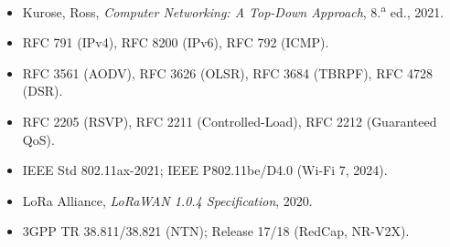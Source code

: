\documentclass[11pt,a4paper]{article}
\begin{document}
\begin{itemize}
  \item Kurose, Ross, \emph{Computer Networking: A Top-Down Approach}, 8.\textsuperscript{a} ed., 2021.
  \item RFC 791 (IPv4), RFC 8200 (IPv6), RFC 792 (ICMP).
  \item RFC 3561 (AODV), RFC 3626 (OLSR), RFC 3684 (TBRPF), RFC 4728 (DSR).
  \item RFC 2205 (RSVP), RFC 2211 (Controlled-Load), RFC 2212 (Guaranteed QoS).
  \item IEEE Std 802.11ax-2021; IEEE P802.11be/D4.0 (Wi-Fi 7, 2024).
  \item LoRa Alliance, \emph{LoRaWAN 1.0.4 Specification}, 2020.
  \item 3GPP TR 38.811/38.821 (NTN); Release 17/18 (RedCap, NR-V2X).
\end{itemize}
\end{document}
